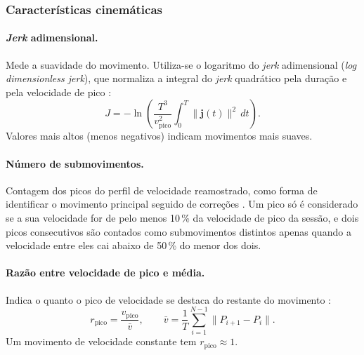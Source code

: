 \subsubsection{Características cinemáticas}

\paragraph{\textit{Jerk} adimensional.} Mede a suavidade do movimento. Utiliza-se o logaritmo do \textit{jerk} adimensional (\textit{log dimensionless jerk}), que normaliza a integral do \textit{jerk} quadrático pela duração e pela velocidade de pico \cite{hogan2009, balasubramanian2015}:
\begin{equation}
    J = -\ln\left( \frac{T^3}{v_{\text{pico}}^2} \int_0^T \lVert \mathbf{j}(t) \rVert^2 \, dt \right) .
\end{equation}
Valores mais altos (menos negativos) indicam movimentos mais suaves.

\paragraph{Número de submovimentos.} Contagem dos picos do perfil de velocidade reamostrado, como forma de identificar o movimento principal seguido de correções \cite{meyer1988}. Um pico só é considerado se a sua velocidade for de pelo menos 10\,\% da velocidade de pico da sessão, e dois picos consecutivos são contados como submovimentos distintos apenas quando a velocidade entre eles cai abaixo de 50\,\% do menor dos dois.

\paragraph{Razão entre velocidade de pico e média.} Indica o quanto o pico de velocidade se destaca do restante do movimento \cite{flash1985}:
\begin{equation}
    r_{\text{pico}} = \frac{v_{\text{pico}}}{\bar{v}}, \qquad
    \bar{v} = \frac{1}{T} \sum_{i=1}^{N-1} \lVert P_{i+1} - P_i \rVert .
\end{equation}
Um movimento de velocidade constante tem $r_{\text{pico}} \approx 1$.

